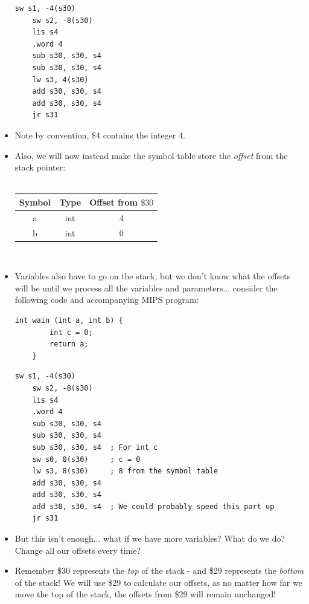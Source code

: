 \documentclass[12pt]{article}
\begin{document}
\begin{itemize}
    \begin{lstlisting}[mathescape, numbers=none, breaklines=true]
    sw s1, -4(s30)
    sw s2, -8(s30)
    lis s4
    .word 4
    sub s30, s30, s4
    sub s30, s30, s4
    lw s3, 4(s30)
    add s30, s30, s4
    add s30, s30, s4
    jr s31
    \end{lstlisting}
    \item Note by convention, $\$4$ contains the integer 4. 
    \item Also, we will now instead make the symbol table store the \emph{offset} from the stack pointer:\\\\
        \begin{tabular}{|c|c|c|}
            \hline
            Symbol & Type & Offset from $\$30$ \\
            \hline
            a & int & 4 \\
            b & int & 0 \\
            \hline
        \end{tabular}\\
    \item Variables also have to go on the stack, but we don't know what the offsets will be until we process all the variables and parameters... consider the following code and accompanying MIPS program:
    \begin{lstlisting}[mathescape, numbers=none, breaklines=true]
    int wain (int a, int b) {
        int c = 0;
        return a;
    }
    \end{lstlisting}
    \begin{lstlisting}[mathescape, numbers=none, breaklines=true]
    sw s1, -4(s30)
    sw s2, -8(s30)
    lis s4
    .word 4
    sub s30, s30, s4
    sub s30, s30, s4
    sub s30, s30, s4  ; For int c
    sw s0, 0(s30)     ; c = 0
    lw s3, 8(s30)     ; 8 from the symbol table
    add s30, s30, s4 
    add s30, s30, s4
    add s30, s30, s4  ; We could probably speed this part up
    jr s31
    \end{lstlisting}
    \item But this isn't enough... what if we have more variables?  What do we do?  Change all our offsets every time?
    \item Remember \$30 represents the \emph{top} of the stack - and \$29 represents the \emph{bottom} of the stack!  We will use \$29 to calculate our offsets, as no matter how far we move the top of the stack, the offsets from \$29 will remain unchanged!
\end{itemize}
\end{document}

